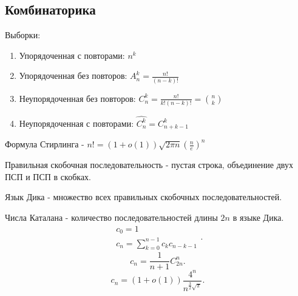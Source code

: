 \documentclass[12pt]{article}
\begin{document}
\subsection{Комбинаторика}
\begin{defn}
    Выборки:
    \begin{enumerate}
	\item Упорядоченная с повторами: $n^k$ 
	\item Упорядоченная без повторов: $A_n^k = \frac{n!}{(n-k)!}$
	\item Неупорядоченная без повторов: $C_n^k = \frac{n!}{k! (n-k)!}={n \choose k}$
	\item Неупорядоченная с повторами: $\widehat{C_n^k} = C_{n+k-1}^k$
    \end{enumerate}
\end{defn}
\begin{defn}
    Формула Стирлинга - $n! = (1 + o(1))\sqrt{2\pi n} (\frac{n}{e})^n$
\end{defn}
\begin{defn}
    Правильная скобочная последовательность - пустая строка, объединение двух ПСП и ПСП в скобках.
\end{defn}
\begin{defn}
    Язык Дика - множество всех правильных скобочных последовательностей.
\end{defn}
\begin{defn}
    Числа Каталана - количество последовательностей длины $2n$ в языке Дика.\\
    \[
	\begin{array}{l}
	c_0 = 1 \\
	c_n = \sum_{k=0}^{n-1}{c_k c_{n-k-1}}
    \end{array}
    .\] 
    \[
	c_n = \frac{1}{n+1}C_{2n}^n
    .\] 
    \[
	c_n = (1 + o(1)) \frac{4^n}{n^{\frac{3}{2} \sqrt{\pi}}}
    .\] 
\end{defn}
\end{document}
